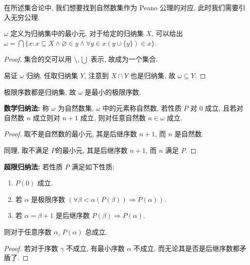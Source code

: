 在所述集合论中, 我们想要找到自然数集作为 Peano 公理的对应, 此时我们需要引入无穷公理.

\begin{definition}
    \label{definition:omega}
    \(\omega\) 定义为归纳集中的最小元, 对于给定的归纳集 \(X\), 可以给出 \(\omega = \bigcap \{x : x \subseteq X \wedge \varnothing \in y \wedge \forall y \in x (y \cup \{y\}) \in x\}\).

    \begin{proof}
        集合的交可以用 \(\setminus, \bigcup\) 表示, 故成为一个集合.

        易证 \(\omega\) 归纳, 任取归纳集 \(Y\), 注意到 \(X \cap Y\) 也是归纳集, 故 \(\omega \subseteq Y\).
    \end{proof}
\end{definition}

\begin{corollary}
    极限序数都是归纳集, 故 \(\omega\) 是最小的极限序数.
\end{corollary}

\begin{theorem}
    \label{theorem:mathematical induction}
    \textbf{数学归纳法:} 称 \(\omega\) 为自然数集, \(\omega\) 中的元素称自然数, 若性质 \(P\) 对 \(0\) 成立, 且若对自然数 \(n\) 成立则对 \(n+1\) 成立, 则对任意自然数 \(n \in \omega\) 成立.
    
    \begin{proof}
        取不是自然数的最小元, 其是后继序数 \(n+1\), 而 \(n\) 是自然数.

        同理, 取不满足 \(P\)的最小元, 其是后继序数 \(n+1\), 而 \(n\) 满足 \(P\).
    \end{proof}
\end{theorem}

\begin{theorem}
    \label{theorem:transfinite induction}
    \textbf{超限归纳法:} 若性质 \(P\) 满足如下性质:
    \begin{enumerate}
        \item \(P(0)\) 成立.
        \item 若 \(\alpha\) 是极限序数 \((\forall \beta < \alpha (P(\beta)) \Rightarrow P(\alpha))\).
        \item 若 \(\alpha = \beta + 1\) 是后继序数 \(P(\beta) \Rightarrow P(\alpha)\).
    \end{enumerate}

    则对于任意序数 \(\alpha\), \(P(\alpha)\) 总成立.

    \begin{proof}
        若对于序数 \(\gamma\) 不成立, 有最小序数 \(\alpha\) 不成立, 而无论其是否是后继序数都矛盾了.
    \end{proof}
\end{theorem}

